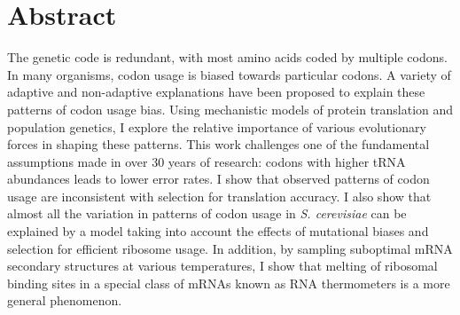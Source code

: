 \chapter*{Abstract}\label{ch:abstract}
The genetic code is redundant, with most amino acids coded by multiple codons. 
In many organisms, codon usage is biased towards particular codons. 
A variety of adaptive and non-adaptive explanations have been proposed to explain these patterns of codon usage bias. 
Using mechanistic models of protein translation and population genetics, I explore the relative importance of various evolutionary forces in shaping these patterns.
This work challenges one of the fundamental assumptions made in over 30 years of research: codons with higher tRNA abundances leads to lower error rates.
I show that observed patterns of codon usage are inconsistent with selection for translation accuracy.
I also show that almost all the variation in patterns of codon usage in \emph{S. cerevisiae} can be explained by a model taking into account the effects of mutational biases and selection for efficient ribosome usage.
In addition, by sampling suboptimal mRNA secondary structures at various temperatures, I show that melting of ribosomal binding sites in a special class of mRNAs known as RNA thermometers is a more general phenomenon.